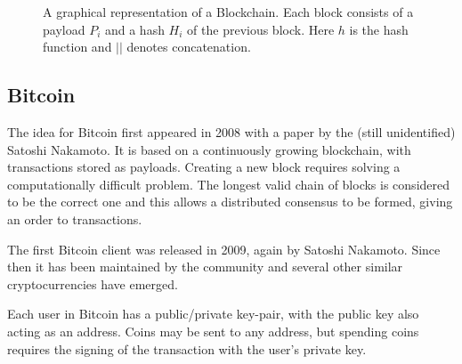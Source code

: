\documentclass[12pt,a4paper,twoside,openright]{report}
\begin{document}
\begin{figure}[h]
\caption[A simple blockchain]{A graphical representation of a Blockchain.
Each block consists of a payload $P_i$ and a hash $H_i$ of the previous block.
Here $h$ is the hash function and $||$ denotes concatenation.}
\label{Blockchain}
\end{figure}

\subsection{Bitcoin}

The idea for Bitcoin first appeared in 2008 with a paper by the (still unidentified) Satoshi Nakamoto\cite{bitcoin-whitepaper}.
It is based on a continuously growing blockchain, with transactions stored as payloads.
Creating a new block requires solving a computationally difficult problem.
The longest valid chain of blocks is considered to be the correct one and this allows a distributed consensus to be formed,
giving an order to transactions.

The first Bitcoin client was released in 2009, again by Satoshi Nakamoto.
Since then it has been maintained by the community and several other similar cryptocurrencies have emerged.


Each user in Bitcoin has a public/private key-pair, with the public key also acting as an address.
Coins may be sent to any address, but spending coins requires the signing of the transaction with the user's private key.
\end{document}
